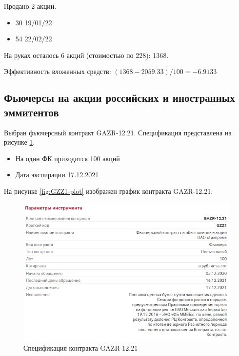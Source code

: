 \documentclass[14pt,a4paper]{extarticle}%
\begin{document}
Продано 2 акции.

\begin{itemize}
  \setlength{\parskip}{0pt}
  \setlength{\itemsep}{0pt plus 1pt}
  \item[] 30    19/01/22
  \item[] 54    22/02/22
\end{itemize}

На руках осталось 6 акций (стоимостью по 228): 1368.

Эффективность вложенных средств: $(1368 - 2059.33) / 100 = -6.9133$

\subsection{Фьючерсы на акции российских и иностранных эммитентов}

Выбран фьючерсный контракт GAZR-12.21. Спецификация представлена на рисунке
\ref{fig:GAZR-12.21-specs}.

\begin{itemize}
  \item На один ФК приходится 100 акций
  \item Дата экспирации 17.12.2021
\end{itemize}

\clearpage

На рисунке \ref{fig:GZZ1-plot} изображен график контракта GAZR-12.21.

\begin{figure}[H]
  \centering
  \includegraphics[scale=0.6]{specs.png}
  \caption{Спецификация контракта GAZR-12.21}
  \label{fig:GAZR-12.21-specs}
\end{figure}
\end{document}
